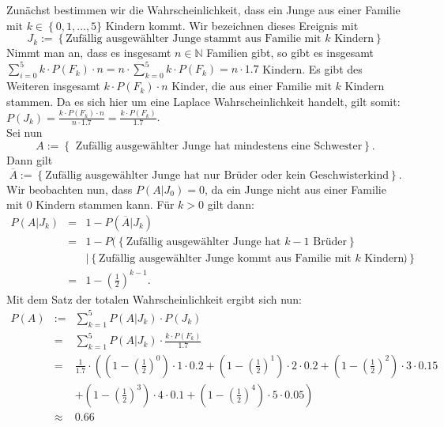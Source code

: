 \begin{Answer}
	Zunächst bestimmen wir die Wahrscheinlichkeit, dass ein Junge aus einer Familie mit $k\in\left\lbrace 0,1,\dots, 5\right.\rbrace$ Kindern kommt. Wir bezeichnen dieses Ereignis mit 
	\begin{equation*}
		J_k:=\left\lbrace \text{Zufällig ausgewählter Junge stammt aus Familie mit } k \text{ Kindern}\right\rbrace
	\end{equation*}
	Nimmt man an, dass es insgesamt $n\in\mathbb{N}$ Familien gibt, so gibt es insgesamt $\sum_{i=0}^5 k \cdot P(F_k)\cdot n=n\cdot\sum_{k=0}^5 k \cdot P(F_k)=n\cdot 1.7$ Kindern. Es gibt des Weiteren insgesamt $k\cdot P(F_k)\cdot n$ Kinder, die aus einer Familie mit $k$ Kindern stammen. Da es sich hier um eine Laplace Wahrscheinlichkeit handelt, gilt somit: $P(J_k)=\frac{k\cdot P(F_k)\cdot n}{n\cdot 1.7}=\frac{k\cdot P(F_k)}{1.7}$.\\
	Sei nun 
	\begin{equation*}
		A:=\left\lbrace\text{ Zufällig ausgewählter Junge hat mindestens eine Schwester}\right\rbrace.
	\end{equation*}
	Dann gilt
	\begin{equation*}
		\overline{A}:=\left\lbrace \text{Zufällig ausgewählter Junge hat nur Brüder oder kein Geschwisterkind}\right\rbrace.
	\end{equation*}
	Wir beobachten nun, dass $P(A\vert J_0)=0$, da ein Junge nicht aus einer Familie mit 0 Kindern stammen kann. Für $k>0$ gilt dann:
	\begin{eqnarray*}
		P(A\vert J_k)&=&1-P(\overline{A}\vert J_k)\\
		&=&1-P(\left\lbrace \text{Zufällig ausgewählter Junge hat } k-1 \text{ Brüder}\right\rbrace\\
		&&\vert\left\lbrace \text{Zufällig ausgewählter Junge kommt aus Familie mit } k \text{ Kindern.}\right\rbrace)\\
		&=& 1-\left(\frac{1}{2}\right)^{k-1}.
	\end{eqnarray*}
	Mit dem Satz der totalen Wahrscheinlichkeit ergibt sich nun:
	\begin{eqnarray*}
		P(A)&:=&\sum_{k=1}^5P(A\vert J_k)\cdot P(J_k)\\
		&=&\sum_{k=1}^5P(A\vert J_k)\cdot \frac{k\cdot P(F_k)}{1.7}\\
		&=&\frac{1}{1.7}\cdot \left(\left(1-\left(\frac{1}{2}\right)^0\right)\cdot 1 \cdot 0.2+\left(1-\left(\frac{1}{2}\right)^1\right)\cdot 2 \cdot 0.2+\left(1-\left(\frac{1}{2}\right)^2\right)\cdot 3 \cdot 0.15\right.\\
		&&\left. +\left(1-\left(\frac{1}{2}\right)^3\right)\cdot 4 \cdot 0.1+\left(1-\left(\frac{1}{2}\right)^4\right)\cdot 5 \cdot 0.05\right)\\
		&\approx&0.66
	\end{eqnarray*}
\end{Answer}

